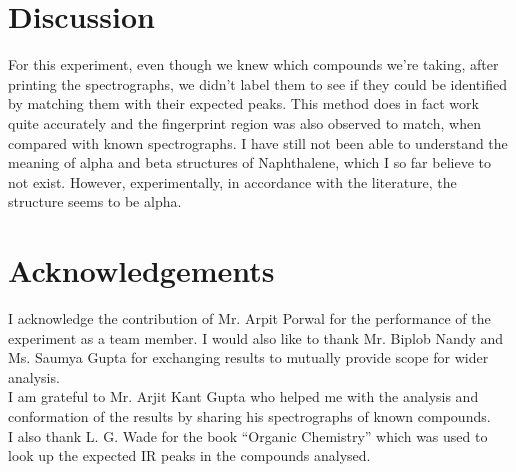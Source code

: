 \section{Discussion}
	For this experiment, even though we knew which compounds we're taking, after printing the spectrographs, we didn't label them to see if they could be identified by matching them with their expected peaks. This method does in fact work quite accurately and the fingerprint region was also observed to match, when compared with known spectrographs. I have still not been able to understand the meaning of alpha and beta structures of Naphthalene, which I so far believe to not exist. However, experimentally, in accordance with the literature, the structure seems to be alpha.\\

\section{Acknowledgements}
	I acknowledge the contribution of Mr. Arpit Porwal for the performance of the experiment as a team member. I would also like to thank Mr. Biplob Nandy and Ms. Saumya Gupta for exchanging results to mutually provide scope for wider analysis. \\
	I am grateful to Mr. Arjit Kant Gupta who helped me with the analysis and conformation of the results by sharing his spectrographs of known compounds.\\
	I also thank L. G. Wade for the book ``Organic Chemistry'' which was used to look up the expected IR peaks in the compounds analysed.